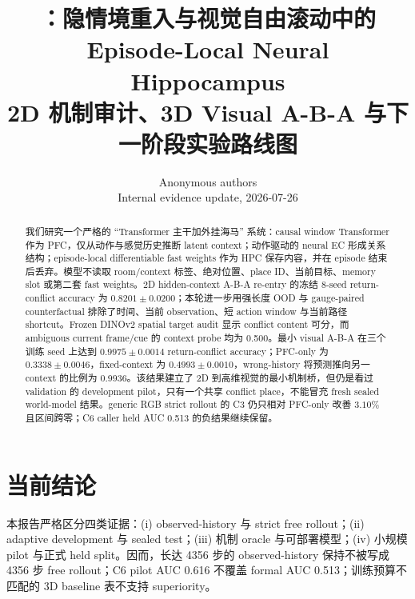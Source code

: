 \documentclass{article}
\title{\model{}：隐情境重入与视觉自由滚动中的\\
Episode-Local Neural Hippocampus\\
\large 2D 机制审计、3D Visual A-B-A 与下一阶段实验路线图}
\author{Anonymous authors\\Internal evidence update, 2026-07-26}
\begin{document}
\maketitle

\begin{abstract}
我们研究一个严格的 ``Transformer 主干加外挂海马'' 系统：causal window Transformer 作为 PFC，仅从动作与感觉历史推断 latent context；动作驱动的 neural EC 形成关系结构；episode-local differentiable fast weights 作为 HPC 保存内容，并在 episode 结束后丢弃。模型不读取 room/context 标签、绝对位置、place ID、当前目标、memory slot 或第二套 fast weights。2D hidden-context A-B-A re-entry 的冻结 8-seed return-conflict accuracy 为 $0.8201\pm0.0200$；本轮进一步用强长度 OOD 与 gauge-paired counterfactual 排除了时间、当前 observation、短 action window 与当前路径 shortcut。Frozen DINOv2 spatial target audit 显示 conflict content 可分，而 ambiguous current frame/cue 的 context probe 均为 0.500。最小 visual A-B-A 在三个训练 seed 上达到 $0.9975\pm0.0014$ return-conflict accuracy；PFC-only 为 $0.3338\pm0.0046$，fixed-context 为 $0.4993\pm0.0010$，wrong-history 将预测推向另一 context 的比例为 0.9936。该结果建立了 2D 到高维视觉的最小机制桥，但仍是看过 validation 的 development pilot，只有一个共享 conflict place，不能冒充 fresh sealed world-model 结果。generic RGB strict rollout 的 C3 仍只相对 PFC-only 改善 $3.10\%$ 且区间跨零；C6 caller held AUC 0.513 的负结果继续保留。
\end{abstract}

\section{当前结论}

\begin{center}
\end{center}

本报告严格区分四类证据：(i) observed-history 与 strict free rollout；(ii) adaptive development 与 sealed test；(iii) 机制 oracle 与可部署模型；(iv) 小规模 pilot 与正式 held split。因而，长达 4356 步的 observed-history 保持不被写成 4356 步 free rollout；C6 pilot AUC 0.616 不覆盖 formal AUC 0.513；训练预算不匹配的 3D baseline 表不支持 superiority。
\end{document}
